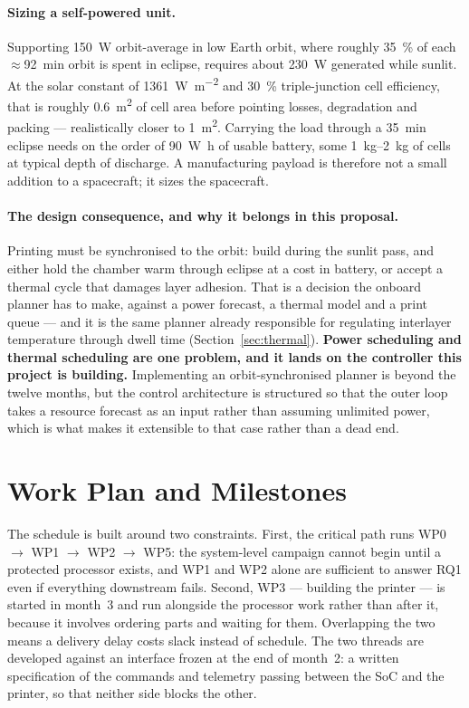 \documentclass[11pt,a4paper]{article}
\begin{document}
\paragraph{Sizing a self-powered unit.} Supporting \SI{150}{\watt} orbit-average
in low Earth orbit, where roughly \SI{35}{\percent} of each
\(\approx\)\SI{92}{\minute} orbit is spent in eclipse, requires about
\SI{230}{\watt} generated while sunlit. At the solar constant of
\SI{1361}{\watt\per\metre\squared} and \SI{30}{\percent} triple-junction cell
efficiency, that is roughly \SI{0.6}{\metre\squared} of cell area before pointing
losses, degradation and packing --- realistically closer to
\SI{1}{\metre\squared}. Carrying the load through a \SI{35}{\minute} eclipse
needs on the order of \SI{90}{\watt\hour} of usable battery, some
\SIrange{1}{2}{\kilo\gram} of cells at typical depth of discharge. A
manufacturing payload is therefore not a small addition to a spacecraft; it sizes
the spacecraft.

\paragraph{The design consequence, and why it belongs in this proposal.}
Printing must be synchronised to the orbit: build during the sunlit pass, and
either hold the chamber warm through eclipse at a cost in battery, or accept a
thermal cycle that damages layer adhesion. That is a decision the onboard planner
has to make, against a power forecast, a thermal model and a print queue --- and
it is the same planner already responsible for regulating interlayer temperature
through dwell time (Section~\ref{sec:thermal}). \textbf{Power scheduling and
thermal scheduling are one problem, and it lands on the controller this project
is building.} Implementing an orbit-synchronised planner is beyond the twelve
months, but the control architecture is structured so that the outer loop takes a
resource forecast as an input rather than assuming unlimited power, which is what
makes it extensible to that case rather than a dead end.

\section{Work Plan and Milestones}

The schedule is built around two constraints. First, the critical path runs
WP0 \(\rightarrow\) WP1 \(\rightarrow\) WP2 \(\rightarrow\) WP5: the system-level
campaign cannot begin until a protected processor exists, and WP1 and WP2 alone
are sufficient to answer RQ1 even if everything downstream fails. Second, WP3 ---
building the printer --- is started in month~3 and run alongside the processor
work rather than after it, because it involves ordering parts and waiting for
them. Overlapping the two means a delivery delay costs slack instead of schedule.
The two threads are developed against an interface frozen at the end of month~2:
a written specification of the commands and telemetry passing between the SoC and
the printer, so that neither side blocks the other.
\end{document}
